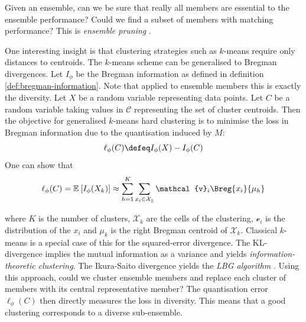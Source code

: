 \documentclass[
	twoside=false, %
]{kaobook}
\begin{document}
Given an ensemble, can we be sure that really all members are essential to the ensemble performance? Could we find a subset of members with matching performance? This is \textit{ensemble pruning} 
\cite{zouggar_SimplifyingRandomForests_2019, yang_MarginOptimizationBased_2012, zhou_EnsembleMethodsFoundations_2012}.

One interesting insight is that clustering strategies such as $k$-means require only distances to centroids. The $k$-means scheme can be generalised to Bregman divergences.
Let $I_{\phi}$ be the Bregman information as defined in definition \ref{def:bregman-information}. Note that applied to ensemble members this is exactly the diversity.
Let $X$ be a random variable representing data points. Let $C$ be a random variable taking values in $\mathcal{C}$ representing the set of cluster centroids. Then the objective for generalised $k$-means hard clustering \cite{banerjee_ClusteringBregmanDivergences_2004} is to minimise the loss in Bregman information due to the quantisation induced by $M$:
$$
 \ell_{\phi}(C) \defeq I_{\phi}(X) - I_{\phi}(C)
$$
One can show \cite{banerjee_ClusteringBregmanDivergences_2004} that
$$
\ell_{\phi}(C) = \mathbb{E}_{}\left[ I_{\phi}(X_{k}) \right]  \approx \sum_{h=1}^K \sum_{x_{i} \in \mathcal{X_{k}}} \mathcal{v}_{i} \Breg{x_{i}}{\mu_{h}}
$$

where $K$ is the number of clusters, $\mathcal{X}_{k}$ are the cells of the clustering, $\mathcal{v}_{i}$ is the distribution of the $x_{i}$ and $\mu_{k}$ is the right Bregman centroid of $\mathcal{X}_{k}$.
Classical $k$-means is a special case of this for the squared-error divergence. The KL-divergence implies the mutual information as a variance and yields \textit{information-theoretic clustering}. The Ikura-Saito divergence yields the \textit{LBG algorithm} \cite{banerjee_ClusteringBregmanDivergences_2004}.
Using this approach, could we cluster ensemble members and replace each cluster of members with its central representative member? The quantisation error $\ell_{\phi}(C)$ then directly measures the loss in diversity. This means that a good clustering corresponds to a diverse sub-ensemble.

\end{document}
